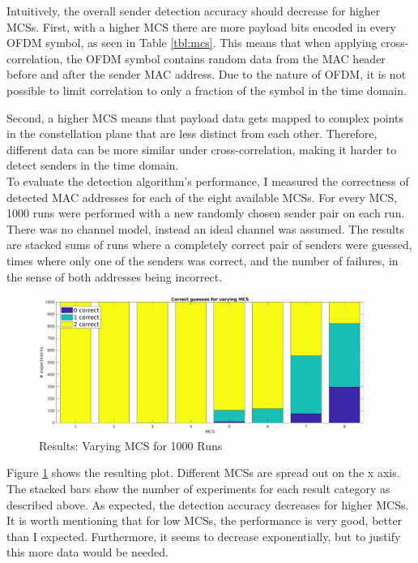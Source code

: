 Intuitively, the overall sender detection accuracy should decrease for higher \glspl{MCS}. First, with a higher \gls{MCS} there are more payload bits encoded in every \gls{OFDM} symbol, as seen in Table \ref{tbl:mcs}. This means that when applying cross-correlation, the \gls{OFDM} symbol contains random data from the \gls{MAC} header before and after the sender \gls{MAC} address. Due to the nature of \gls{OFDM}, it is not possible to limit correlation to only a fraction of the symbol in the time domain.

Second, a higher \gls{MCS} means that payload data gets mapped to complex points in the constellation plane that are less distinct from each other. Therefore, different data can be more similar under cross-correlation, making it harder to detect senders in the time domain.\\

To evaluate the detection algorithm's performance, I measured the correctness of detected \gls{MAC} addresses for each of the eight available \glspl{MCS}. For every \gls{MCS}, 1000 runs were performed with a new randomly chosen sender pair on each run. There was no channel model, instead an ideal channel was assumed. The results are stacked sums of runs where a completely correct pair of senders were guessed, times where only one of the senders was correct, and the number of failures, in the sense of both addresses being incorrect.

\begin{figure}[H]
	\centering
	\includegraphics[height=4.5cm]{gfx/plots/mcs}
	\caption{Results: Varying MCS for 1000 Runs}
	\label{fig:vary_mcs}
\end{figure}

Figure \ref{fig:vary_mcs} shows the resulting plot. Different \glspl{MCS} are spread out on the x axis. The stacked bars show the number of experiments for each result category as described above. As expected, the detection accuracy decreases for higher \glspl{MCS}. It is worth mentioning that for low \glspl{MCS}, the performance is very good, better than I expected. Furthermore, it seems to decrease exponentially, but to justify this more data would be needed.


